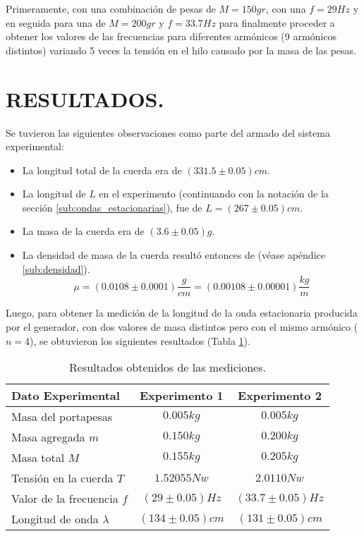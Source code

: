 \documentclass[10pt,a4paper]{article}
\begin{document}
Primeramente, con una combinación de pesas de \(M=150gr\), con una \(f=29Hz\) y en seguida para una de \(M=200gr\) y \(f=33.7Hz\) para finalmente proceder a obtener los valores de las frecuencias para diferentes armónicos (9 armónicos distintos) variando 5 veces la tensión en el hilo causado por la masa de las pesas.

\newpage

\section{RESULTADOS.} %
 Se tuvieron las siguientes observaciones como parte del armado del sistema experimental:
 \begin{itemize}[noitemsep]
	\item La longitud total de la cuerda era de $ (331.5\pm 0.05) cm $.
	\item La longitud de \(L\) en el experimento (continuando con la notación de la sección \ref{sub:ondas_estacionarias}), fue de $ L = (267 \pm 0.05) cm $.
	\item La masa de la cuerda era de $( 3.6 \pm 0.05)g $.
	\item La densidad de masa de la cuerda resultó entonces de (véase apéndice \ref{sub:densidad}).
	$$\mu=\left(0.0108\pm0.0001\right)\dfrac{g}{cm}=(0.00108\pm 0.00001)\dfrac{kg}{m}$$
 \end{itemize}
Luego, para obtener la medición de la longitud de la onda estacionaria producida por el generador, con dos valores de masa distintos pero con el mismo armónico ($n=4$), se obtuvieron los siguientes resultados (Tabla \ref{tab:primera}).
\begin{table}[ht]
\centering
\caption{Resultados obtenidos de las mediciones.}
	\begin{tabular}{|l|c|c|}
			\hline
			Dato Experimental & Experimento 1 & Experimento 2 \\ 			\hline
			Masa del portapesas & $ 0.005 kg $ & $ 0.005 kg $ \\ 			\hline
			Masa agregada $ m $& $ 0.150 kg $ & $ 0.200 kg $  \\ 			\hline
			Masa total $ M $ & $ 0.155kg $ & $ 0.205kg $  \\ 			\hline
			Tensión en la cuerda $ T $ & $ 1.52055 Nw $  & $ 2.0110 Nw$ \\ 			\hline
			Valor de la frecuencia $ f $ & $ (29\pm 0.05)Hz$  & $ (33.7\pm 0.05)Hz $ \\ 			\hline
			Longitud de onda $ \lambda $ & $ (134\pm0.05)cm $ & $ (131\pm0.05)cm $  \\ 			\hline
	\end{tabular}
	\label{tab:primera}
\end{table}\\
\end{document}

